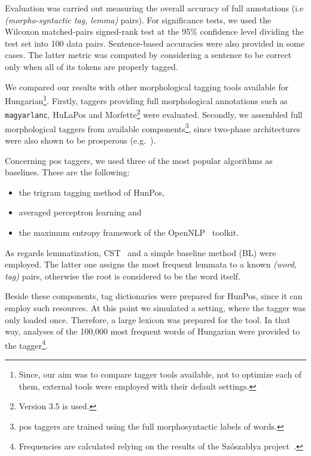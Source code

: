 Evaluation was carried out measuring the overall accuracy of full annotations (i.e \emph{(morpho-syntactic tag, lemma)} pairs). 
For significance tests, we used the Wilcoxon matched-pairs signed-rank test at the 95\% confidence level dividing the test set into 100 data pairs.
Sentence-based accuracies were also provided in some cases. 
The latter metric was computed by considering a sentence to be correct only when all of its tokens are properly tagged. 

We compared our results with other morphological tagging tools available for Hungarian\footnote{Since, our aim was to compare tagger tools available, not to optimize each of them, external tools were employed with their default settings.}. 
Firstly, taggers providing full morphological annotations such as \texttt{magyarlanc}, HuLaPos and Morfette\footnote{Version 3.5 is used.} were evaluated.  
Secondly, we assembled full morphological taggers from available components\footnote{\acrshort{pos} taggers are trained using the full morphosyntactic labels of words.}, since two-phase architectures were also shown to be prosperous (e.g.~\cite{Agic2013,Erjavec2004}). 

Concerning \gls{pos} taggers, we used three of the most popular algorithms as baselines. These are the following:
\begin{itemize}
  \item the trigram tagging method of HunPos,
  \item averaged perceptron learning and
  \item the maximum entropy framework of the OpenNLP~\cite{Baldridge2002} toolkit.
\end{itemize}

As regards lemmatization, CST~\cite{Jongejan} and a simple baseline method (BL) were employed. 
The latter one assigns the most frequent lemmata to a known \emph{(word, tag)} pairs, otherwise the root is considered to be the word itself.

Beside these components, tag dictionaries were prepared for HunPos, since it can employ such resources.  
At this point we simulated a setting, where the tagger was only loaded once.
Therefore, a large lexicon was prepared for the tool.
In that way, analyses of the 100,000 most frequent words of Hungarian were provided to the tagger\footnote{Frequencies are calculated relying on the results of the Szószablya project~\cite{Halacsy2004}.}.



